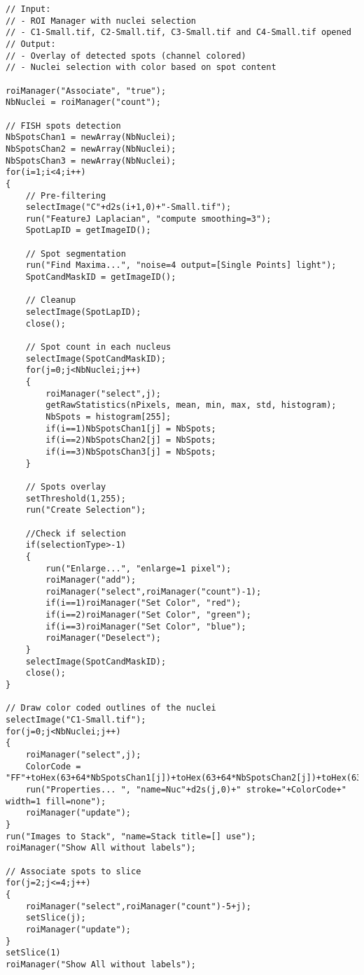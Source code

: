 \begin{lstlisting}
// Input: 
// - ROI Manager with nuclei selection
// - C1-Small.tif, C2-Small.tif, C3-Small.tif and C4-Small.tif opened
// Output: 
// - Overlay of detected spots (channel colored)
// - Nuclei selection with color based on spot content

roiManager("Associate", "true");
NbNuclei = roiManager("count");

// FISH spots detection
NbSpotsChan1 = newArray(NbNuclei);
NbSpotsChan2 = newArray(NbNuclei);
NbSpotsChan3 = newArray(NbNuclei);
for(i=1;i<4;i++)
{	
	// Pre-filtering
	selectImage("C"+d2s(i+1,0)+"-Small.tif");
	run("FeatureJ Laplacian", "compute smoothing=3");
	SpotLapID = getImageID();
	
	// Spot segmentation
	run("Find Maxima...", "noise=4 output=[Single Points] light");
	SpotCandMaskID = getImageID();
	
	// Cleanup
	selectImage(SpotLapID);	
	close();

	// Spot count in each nucleus
	selectImage(SpotCandMaskID);
	for(j=0;j<NbNuclei;j++)
	{
		roiManager("select",j);
		getRawStatistics(nPixels, mean, min, max, std, histogram);
		NbSpots = histogram[255];
		if(i==1)NbSpotsChan1[j] = NbSpots;
		if(i==2)NbSpotsChan2[j] = NbSpots;
		if(i==3)NbSpotsChan3[j] = NbSpots;
	}
		
	// Spots overlay
	setThreshold(1,255);
	run("Create Selection");
	
	//Check if selection
	if(selectionType>-1)
	{
		run("Enlarge...", "enlarge=1 pixel");
		roiManager("add");
		roiManager("select",roiManager("count")-1);
		if(i==1)roiManager("Set Color", "red");
		if(i==2)roiManager("Set Color", "green");
		if(i==3)roiManager("Set Color", "blue");
		roiManager("Deselect");
	}
	selectImage(SpotCandMaskID);
	close();
}
	
// Draw color coded outlines of the nuclei
selectImage("C1-Small.tif");
for(j=0;j<NbNuclei;j++)
{
	roiManager("select",j);
	ColorCode = "FF"+toHex(63+64*NbSpotsChan1[j])+toHex(63+64*NbSpotsChan2[j])+toHex(63+64*NbSpotsChan3[j]);
	run("Properties... ", "name=Nuc"+d2s(j,0)+" stroke="+ColorCode+" width=1 fill=none");
	roiManager("update");
}
run("Images to Stack", "name=Stack title=[] use");
roiManager("Show All without labels");

// Associate spots to slice
for(j=2;j<=4;j++)
{
	roiManager("select",roiManager("count")-5+j);
	setSlice(j);
	roiManager("update");
}
setSlice(1)
roiManager("Show All without labels");

\end{lstlisting}